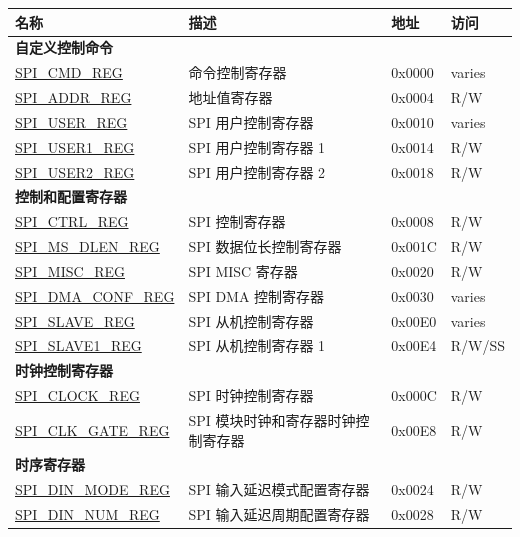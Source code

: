 \begin{longtable}{ | p{6cm} | p{6.6cm} | p{1.3cm} | p{1.7cm} | }
\hline\rowcolor{lightgray}
\textbf{名称} & \textbf{描述} &  \textbf{地址} & \textbf{访问} \\ \hline
\endhead
\multicolumn{4}{|l|}{\textbf{自定义控制命令}} \\ \hline
\hyperref[regdesc:SPICMDREG]{SPI\_CMD\_REG} & 命令控制寄存器 & 0x0000 & varies \\ \hline
\hyperref[regdesc:SPIADDRREG]{SPI\_ADDR\_REG} & 地址值寄存器 & 0x0004 & R/W \\ \hline
\hyperref[regdesc:SPIUSERREG]{SPI\_USER\_REG} & SPI 用户控制寄存器 & 0x0010 & varies \\ \hline
\hyperref[regdesc:SPIUSER1REG]{SPI\_USER1\_REG} & SPI 用户控制寄存器 1 & 0x0014 & R/W \\ \hline
\hyperref[regdesc:SPIUSER2REG]{SPI\_USER2\_REG} & SPI 用户控制寄存器 2 & 0x0018 & R/W \\ \hline
\multicolumn{4}{|l|}{\textbf{控制和配置寄存器}} \\ \hline
\hyperref[regdesc:SPICTRLREG]{SPI\_CTRL\_REG} & SPI  控制寄存器 & 0x0008 & R/W \\ \hline
\hyperref[regdesc:SPIMSDLENREG]{SPI\_MS\_DLEN\_REG} & SPI 数据位长控制寄存器 & 0x001C & R/W \\ \hline
\hyperref[regdesc:SPIMISCREG]{SPI\_MISC\_REG} & SPI MISC 寄存器 & 0x0020 & R/W \\ \hline
\hyperref[regdesc:SPIDMACONFREG]{SPI\_DMA\_CONF\_REG} & SPI DMA 控制寄存器 & 0x0030 & varies \\ \hline
\hyperref[regdesc:SPISLAVEREG]{SPI\_SLAVE\_REG} & SPI 从机控制寄存器 & 0x00E0 & varies \\ \hline
\hyperref[regdesc:SPISLAVE1REG]{SPI\_SLAVE1\_REG} & SPI 从机控制寄存器 1 & 0x00E4 & R/W/SS \\ \hline
\multicolumn{4}{|l|}{\textbf{时钟控制寄存器}} \\ \hline
\hyperref[regdesc:SPICLOCKREG]{SPI\_CLOCK\_REG} & SPI 时钟控制寄存器 & 0x000C & R/W \\ \hline
\hyperref[regdesc:SPICLKGATEREG]{SPI\_CLK\_GATE\_REG} & SPI 模块时钟和寄存器时钟控制寄存器 & 0x00E8 & R/W \\ \hline
\multicolumn{4}{|l|}{\textbf{时序寄存器}} \\ \hline
\hyperref[regdesc:SPIDINMODEREG]{SPI\_DIN\_MODE\_REG} & SPI 输入延迟模式配置寄存器 & 0x0024 & R/W \\ \hline
\hyperref[regdesc:SPIDINNUMREG]{SPI\_DIN\_NUM\_REG} & SPI 输入延迟周期配置寄存器 & 0x0028 & R/W \\ \hline

\end{longtable}
